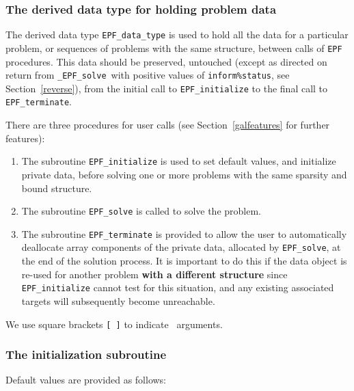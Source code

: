 \documentclass{galahad}
\newcommand{\packagename}{EPF}
\newcommand{\fullpackagename}{\libraryname\_\packagename}
\newcommand{\solver}{{\tt \fullpackagename\_solve}}
\begin{document}

\subsubsection{The derived data type for holding problem data}\label{typedata}
The derived data type
{\tt \packagename\_data\_type}
is used to hold all the data for a particular problem,
or sequences of problems with the same structure, between calls of
{\tt \packagename} procedures.
This data should be preserved, untouched (except as directed on
return from \solver\ with positive values of {\tt inform\%status}, see
Section~\ref{reverse}),
from the initial call to
{\tt \packagename\_initialize}
to the final call to
{\tt \packagename\_terminate}.





\galarguments
There are three procedures for user calls
(see Section~\ref{galfeatures} for further features):

\begin{enumerate}
\item The subroutine
      {\tt \packagename\_initialize}
      is used to set default values, and initialize private data,
      before solving one or more problems with the
      same sparsity and bound structure.
\item The subroutine
      {\tt \packagename\_solve}
      is called to solve the problem.
\item The subroutine
      {\tt \packagename\_terminate}
      is provided to allow the user to automatically deallocate array
       components of the private data, allocated by
       {\tt \packagename\_solve},
       at the end of the solution process.
       It is important to do this if the data object is re-used for another
       problem {\bf with a different structure}
       since {\tt \packagename\_initialize} cannot test for this situation,
       and any existing associated targets will subsequently become unreachable.
\end{enumerate}
We use square brackets {\tt [ ]} to indicate \optional\ arguments.


\subsubsection{The initialization subroutine}\label{subinit}
 Default values are provided as follows:
\vspace*{1mm}
\end{document}
